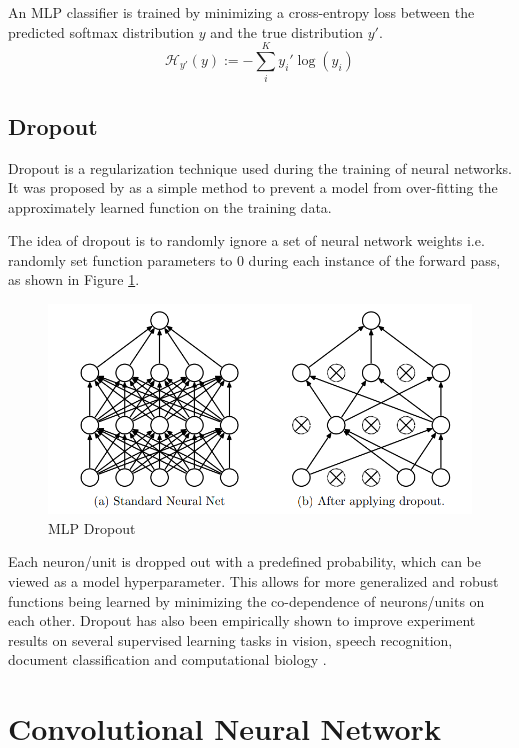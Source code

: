 An MLP classifier is trained by minimizing a cross-entropy loss between the predicted softmax distribution $y$ and the true distribution $y'$.
\begin{equation}
	\mathcal{H}_{y'} (y) := - \sum_{i}^K y_{i}' \log (y_i)
\end{equation}


\subsection{Dropout}

Dropout is a regularization technique used during the training of neural networks. It was proposed by \cite{srivastava2014dropout} as a simple method to prevent a model from over-fitting the approximately learned function on the training data.

The idea of dropout is to randomly ignore a set of neural network weights i.e. randomly set function parameters to 0 during each instance of the forward pass, as shown in Figure \ref{fig:dropout}.

\begin{figure}[ht]
	\centering
	\includegraphics[width=\textwidth]{images/dropout}
	\caption{\label{fig:dropout} MLP Dropout}
\end{figure}

Each neuron/unit is dropped out with a predefined probability, which can be viewed as a model hyperparameter. This allows for more generalized and robust functions being learned by minimizing the co-dependence of neurons/units on each other. Dropout has also been empirically shown to improve experiment results on several supervised learning tasks in vision, speech recognition, document classification and computational biology \citep{srivastava2014dropout}.


\section{Convolutional Neural Network}

